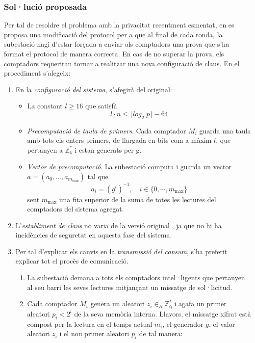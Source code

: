 \subsubsection{Sol·lució proposada}
Per tal de resoldre el problema amb la privacitat recentment esmentat, en \cite{repair-busom} es proposa una modificació del protocol per a que al final de cada ronda, la subestació hagi d'estar forçada a enviar als comptadors una prova que s'ha format el protocol de manera correcta. En cas de no superar la prova, els comptadors requeriran tornar a realitzar una nova configuració de claus. En el procediment s'afegeix:
\begin{enumerate}
	\item En la \textit{configuració del sistema}, s'afegirà del original:
	\begin{itemize}
		\item La constant $l \ge 16 $ que satisfà \[l \cdot n \le \lfloor log_2 \; p \rfloor - 64\]
		\item \textit{Precomputació de taula de primers}. Cada comptador $M_i$ guarda una taula amb tots els enters primers, de llargada en bits com a màxim $l$, que pertanyen a $\mathbb{Z_q^*}$ i estan generats per g.
		\item \textit{Vector de precomputació}. La subestació computa i guarda un vector $a = (a_0, \dots, a_{m_{\textrm{max}}})$ tal que \[a_i = (g^i)^{-1}, \quad i \in \{0, \cdots, m_{\textrm{max}}\}\] sent $m_{\textrm{max}}$ una fita superior de la suma de totes les lectures del comptadors del sistema agregat.
	\end{itemize}
	\item L'\textit{establiment de claus} no varia de la versió original \cite{busom}, ja que no hi ha incidències de seguretat en aquesta fase del sistema.
	\item Per tal d'explicar els canvis en la \textit{transmissió del consum}, s'ha preferit explicar tot el procès de comunicació.
	\begin{enumerate}
		\item La subestació demana a tots els comptadors intel·ligents que pertanyen al seu barri les seves lectures mitjançant un missatge de sol·licitud.
		\item Cada comptador $M_i$ genera un aleatori $z_i \in_R \mathbb{Z_q^*}$ i agafa un primer aleatori $p_i < 2^l$ de la seva memòria interna. Llavors, el missatge xifrat està compost per la lectura en el temps actual $m_i$, el generador $g$, el valor aleatori $z_i$ i el nou primer aleatori $p_i$ de tal manera:

\end{enumerate}
\end{enumerate}
